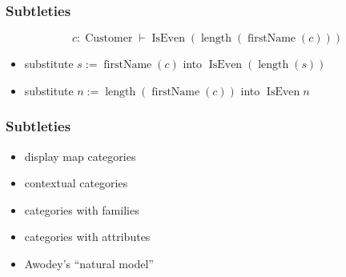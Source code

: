\documentclass[
xcolor={usenames,dvipsnames,svgnames},
]{beamer}
\DeclareMathOperator{\Customer}{Customer}
\DeclareMathOperator{\IsEven}{IsEven}
\begin{document}

  \begin{frame}
    \frametitle{Subtleties}
    \begin{center}

      \[
        c : \Customer \vdash \IsEven (\operatorname{length}(\operatorname{firstName}(c)))
      \]

      \begin{itemize}
        \item substitute $s := \operatorname{firstName}(c)$ into $\IsEven(\operatorname{length}(s))$
        \item substitute $n := \operatorname{length}(\operatorname{firstName}(c))$ into $\IsEven n$
      \end{itemize}
    \end{center}
  \end{frame}

  \begin{frame}
    \frametitle{Subtleties}
    \begin{center}

      \begin{itemize}
        \item display map categories
        \item contextual categories
        \item categories with families
        \item categories with attributes
        \item Awodey's ``natural model''
      \end{itemize}
    \end{center}
  \end{frame}
\end{document}
